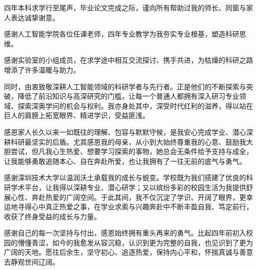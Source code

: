 
\begin{thankscontent}
四年本科求学行至尾声，毕业论文完成之际，谨向所有帮助过我的师长、同窗与家人表达诚挚谢意。

感谢人工智能学院各位任课老师，四年专业教学为我夯实专业根基，塑造科研思维。

感谢实验室的小组成员，在求学途中相互交流探讨、携手共进，为枯燥的科研之路增添了许多温暖与助力。

同时，由衷致敬深耕人工智能领域的科研学者与先行者。正是他们的不断探索与突破，降低了前沿知识与高深研究的门槛，让每一个普通人都拥有深入研习专业领域、探索深奥学问的机会与权利。我亦身处其中，深受时代红利的滋养，得以站在巨人的肩膀上拓宽眼界、精进学识，受益匪浅。

感恩家人长久以来一如既往的理解、包容与默默守候，是我安心完成学业、潜心深耕科研最坚实的后盾。尤其感恩我的母亲，从小到大始终尊重我的心意、鼓励我大胆尝试，但凡我心生热爱、想要学习探索的事物，她总会无条件给予支持与成全，让我能够勇敢追随本心、自在奔赴所爱，也让我拥有了一往无前的底气与勇气。

感谢深圳技术大学以温润沃土承载我的成长与蜕变。学校既为我们搭建了优良的科研学术平台，让我得以深耕专业、潜心研学；又以缤纷多彩的校园生活为我提供舒展心性、奔赴热爱的广阔空间。于此其间，我不仅沉淀了学识、开阔了眼界，更幸运地寻得心中真正热爱之事，在学业求索与兴趣奔赴中不断丰盈自我、笃定前行，收获了终身受益的成长与力量。

感谢自己的每一次坚持与付出，感恩始终拥有重头再来的勇气。比起四年前初入校园的懵懂青涩，如今的我愈发从容沉稳，认识到更为完整的自我，也见识到了更为广阔的天地。愿往后余生，坚守初心、追逐热爱，保持内心平和，怀揣真诚与善意去静观世间辽阔。

\end{thankscontent}
